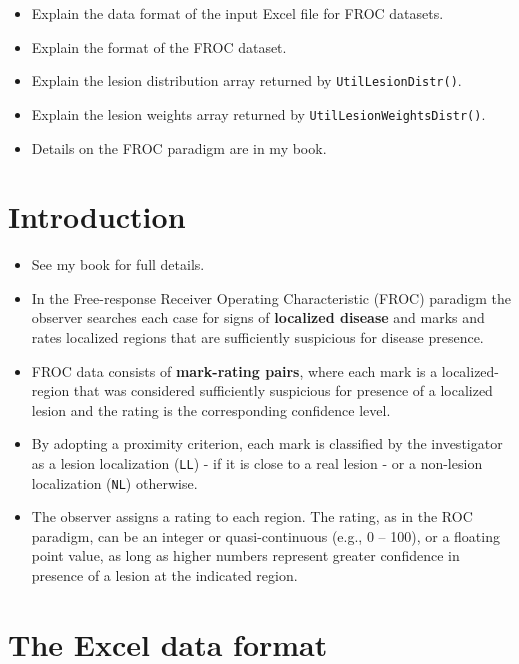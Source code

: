 \documentclass[
]{book}
\providecommand{\tightlist}{%
  \setlength{\itemsep}{0pt}\setlength{\parskip}{0pt}}
\begin{document}
\begin{itemize}
\tightlist
\item
  Explain the data format of the input Excel file for FROC datasets.
\item
  Explain the format of the FROC dataset.
\item
  Explain the lesion distribution array returned by \texttt{UtilLesionDistr()}.
\item
  Explain the lesion weights array returned by \texttt{UtilLesionWeightsDistr()}.
\item
  Details on the FROC paradigm are in my book.
\end{itemize}

\hypertarget{introduction-2}{%
\section{Introduction}\label{introduction-2}}

\begin{itemize}
\tightlist
\item
  See my book \citet{RN2680} for full details.
\item
  In the Free-response Receiver Operating Characteristic (FROC) paradigm \citep{RN761} the observer searches each case for signs of \textbf{localized disease} and marks and rates localized regions that are sufficiently suspicious for disease presence.
\item
  FROC data consists of \textbf{mark-rating pairs}, where each mark is a localized-region that was considered sufficiently suspicious for presence of a localized lesion and the rating is the corresponding confidence level.
\item
  By adopting a proximity criterion, each mark is classified by the investigator as a lesion localization (\texttt{LL}) - if it is close to a real lesion - or a non-lesion localization (\texttt{NL}) otherwise.
\item
  The observer assigns a rating to each region. The rating, as in the ROC paradigm, can be an integer or quasi-continuous (e.g., 0 -- 100), or a floating point value, as long as higher numbers represent greater confidence in presence of a lesion at the indicated region.
\end{itemize}

\hypertarget{the-excel-data-format-1}{%
\section{The Excel data format}\label{the-excel-data-format-1}}
\end{document}
